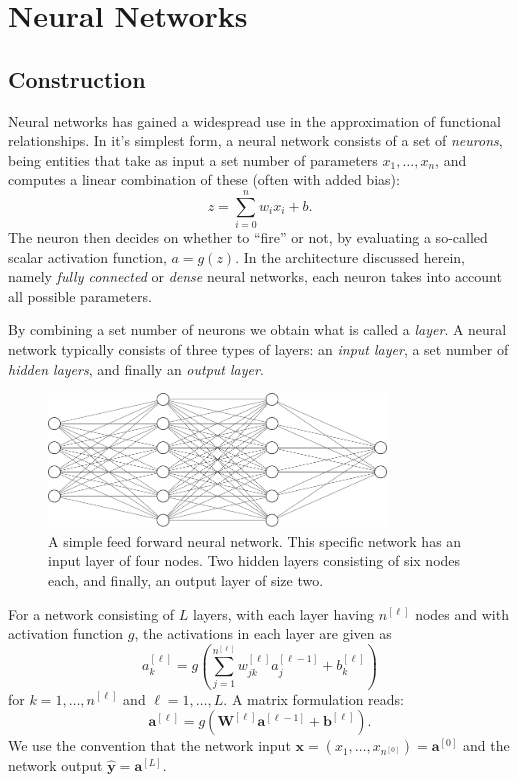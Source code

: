 \documentclass[a4paper, 11pt, oneside, article]{memoir}
\newcommand{\yhat}{\hat{\bm{y}}}
\newcommand{\mat}[1]{\bm{#1}}
\begin{document}
	\section{Neural Networks}

	\subsection{Construction}
	Neural networks has gained a widespread use in the approximation of
	functional relationships. In it's simplest form, a neural network
	consists of a set of \emph{neurons}, being entities that take as input
	a set number of parameters \( x_1, \ldots, x_n \), and computes a
	linear combination of these (often with added bias):
	\begin{equation}
		z = \sum_{i = 0}^n w_ix_i + b.
	\end{equation}
	The
	neuron then decides on whether to ``fire'' or not, by evaluating a
	so-called scalar activation function, \( a = g(z) \). In the architecture
	discussed herein, namely \emph{fully connected} or \emph{dense} neural
	networks, each neuron takes into account all possible parameters. 
	
	By combining a set number of neurons we obtain what is called a
	\emph{layer}. A neural network typically consists of three types of
	layers: an \emph{input layer}, a set number of \emph{hidden layers},
	and finally an \emph{output layer}. 

	\begin{figure}[htbp]
		\centering
		\includegraphics[width=0.8\textwidth]{imgs/fcc_nn.pdf}
		\caption{A simple feed forward neural network. This specific
		network has an input layer of four nodes. Two hidden layers
	consisting of six nodes each, and finally, an output layer of size
two.}%
\label{fig:fc_nn}
	\end{figure}
	
	For a network consisting of \( L \) layers, with each layer having \(
	n^{[\ell]} \) nodes and with activation function \( g\), the
	activations in each layer are given as 
	\begin{equation}
		a^{[\ell]}_k = g\left(\sum_{j = 1}^{n^{[\ell]}} w_{jk}^{[\ell]} a^{[\ell - 1]}_j  + b^{[\ell]}_k \right)
	\end{equation}
	for \( k = 1, \ldots, n^{[\ell]} \) and \( \ell = 1, \ldots, L \). 
	A matrix formulation reads:
	\begin{equation}
	\mat{a}^{[\ell]} = g\left(\mat{W}^{[\ell]} \mat{a}^{[\ell - 1]} + \mat{b}^{[\ell]}\right).
	\end{equation}
	We use the convention that the network input \( \mat{x} = (x_1, \ldots,
	x_{n^{[0]}}) = \mat{a}^{[0]} \) and the network output \( \yhat =
	\mat{a}^{[L]} \).
	
\end{document}
